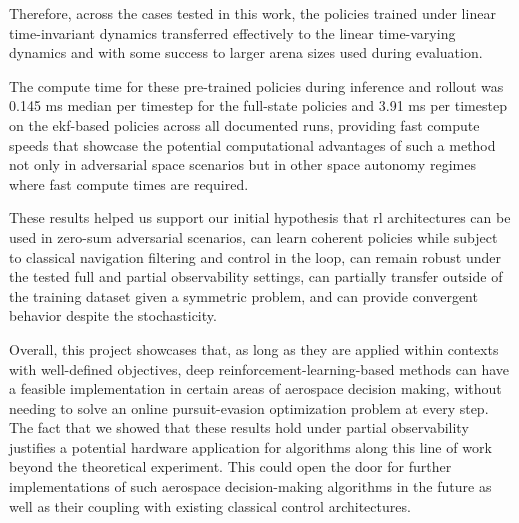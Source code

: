 Therefore, across the cases tested in this work, the policies trained under linear time-invariant dynamics transferred effectively to the linear time-varying dynamics and with some success to larger arena sizes used during evaluation. 


The compute time for these pre-trained policies during inference and rollout was 0.145 ms median per timestep for the full-state policies and 3.91 ms per timestep on the \acs{ekf}-based policies across all documented runs, providing fast compute speeds that showcase the potential computational advantages of such a method not only in adversarial space scenarios but in other space autonomy regimes where fast compute times are required.

These results helped us support our initial hypothesis that \acs{rl} architectures can be used in zero-sum adversarial scenarios, can learn coherent policies while subject to classical navigation filtering and control in the loop, can remain robust under the tested full and partial observability settings, can partially transfer outside of the training dataset given a symmetric problem, and can provide convergent behavior despite the stochasticity.


Overall, this project showcases that, as long as they are applied within contexts with well-defined objectives, deep reinforcement-learning-based methods can have a feasible implementation in certain areas of aerospace decision making, without needing to solve an online pursuit-evasion optimization problem at every step. The fact that we showed that these results hold under partial observability justifies a potential hardware application for algorithms along this line of work beyond the theoretical experiment. This could open the door for further implementations of such aerospace decision-making algorithms in the future as well as their coupling with existing classical control architectures.
